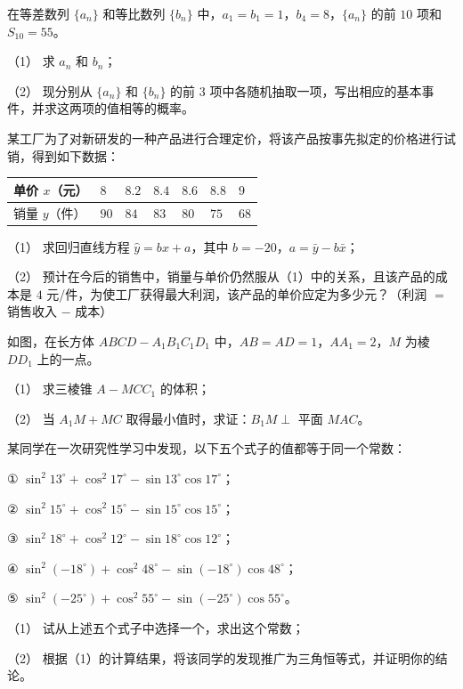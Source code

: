 \begin{question}
在等差数列 $\{a_n\}$ 和等比数列 $\{b_n\}$ 中，$a_1=b_1=1$，$b_4=8$，$\{a_n\}$ 的前 $10$ 项和 $S_{10}=55$。

（1） 求 $a_n$ 和 $b_n$；

（2） 现分别从 $\{a_n\}$ 和 $\{b_n\}$ 的前 $3$ 项中各随机抽取一项，写出相应的基本事件，并求这两项的值相等的概率。

\end{question}
\begin{question}
某工厂为了对新研发的一种产品进行合理定价，将该产品按事先拟定的价格进行试销，得到如下数据：

\begin{center}
\begin{tabular}{lllllll}
\toprule
单价 $x$（元） & $8$ & $8.2$ & $8.4$ & $8.6$ & $8.8$ & $9$ \\
\midrule
销量 $y$（件） & $90$ & $84$ & $83$ & $80$ & $75$ & $68$ \\
\bottomrule
\end{tabular}
\end{center}

（1） 求回归直线方程 $\hat y=bx+a$，其中 $b=-20$，$a=\bar y-b\bar x$；

（2） 预计在今后的销售中，销量与单价仍然服从（1）中的关系，且该产品的成本是 $4$ 元/件，为使工厂获得最大利润，该产品的单价应定为多少元？（利润 $=$ 销售收入 $-$ 成本）

\Needspace{0.4\textheight}
\end{question}
\begin{question}
如图，在长方体 $ABCD-A_1B_1C_1D_1$ 中，$AB=AD=1$，$AA_1=2$，$M$ 为棱 $DD_1$ 上的一点。

（1） 求三棱锥 $A-MCC_1$ 的体积；

（2） 当 $A_1M+MC$ 取得最小值时，求证：$B_1M\perp$ 平面 $MAC$。
\nopagebreak[4]
\begin{center}\end{center}
\nopagebreak[4]
\end{question}
\begin{question}
某同学在一次研究性学习中发现，以下五个式子的值都等于同一个常数：

① $\sin^2 13^\circ+\cos^2 17^\circ-\sin 13^\circ\cos 17^\circ$；

② $\sin^2 15^\circ+\cos^2 15^\circ-\sin 15^\circ\cos 15^\circ$；

③ $\sin^2 18^\circ+\cos^2 12^\circ-\sin 18^\circ\cos 12^\circ$；

④ $\sin^2(-18^\circ)+\cos^2 48^\circ-\sin(-18^\circ)\cos 48^\circ$；

⑤ $\sin^2(-25^\circ)+\cos^2 55^\circ-\sin(-25^\circ)\cos 55^\circ$。

（1） 试从上述五个式子中选择一个，求出这个常数；

（2） 根据（1）的计算结果，将该同学的发现推广为三角恒等式，并证明你的结论。

\Needspace{0.4\textheight}
\end{question}
